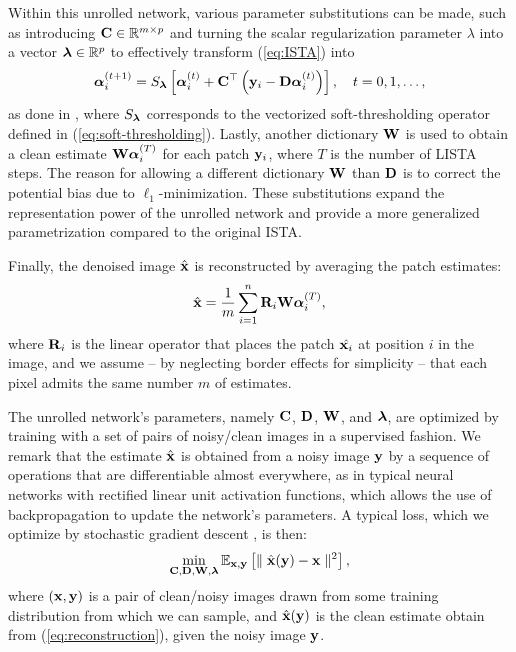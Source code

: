 Within this unrolled network, various parameter substitutions can be made, such as introducing $\mathbf C \in \mathbb R^{m \times p}$ and turning the scalar regularization parameter $\lambda$ into a vector $\boldsymbol \lambda \in \mathbb R^p$ to effectively transform (\ref{eq:ISTA}) into
\begin{equation}
\label{eq:ISTA_C}
    \boldsymbol \alpha_i^{(t+1)} = S_{\boldsymbol \lambda}\left[\boldsymbol \alpha_i^{(t)} + \mathbf C^{\top}\left(\mathbf y_i - \mathbf D \boldsymbol \alpha_i^{(t)} \right)\right], \quad t=0,1,\ldots,
\end{equation}
as done in \cite{simon_rethinking_2019, lecouat_fully_2020}, where $S_{\boldsymbol \lambda}$ corresponds to the vectorized soft-thresholding operator defined in (\ref{eq:soft-thresholding}).
Lastly, another dictionary $\mathbf W$ is used to obtain a clean estimate $\mathbf W \boldsymbol \alpha_i^{(T)}$ for each patch $\mathbf y_i$, where $T$ is the number of LISTA steps.
The reason for allowing a different dictionary $\mathbf W$ than $\mathbf D$ is to correct the potential bias due to $\ell_1$-minimization.
These substitutions expand the representation power of the unrolled network and provide a more generalized parametrization compared to the original ISTA.

Finally, the denoised image $\hat{\mathbf x}$ is reconstructed by averaging the patch estimates:
\begin{equation}
\label{eq:reconstruction}
    \hat{\mathbf x} = \frac{1}{m} \sum_{i=1}^n \mathbf R_i \mathbf W \boldsymbol \alpha_i^{(T)},
\end{equation}
where $\mathbf R_i$ is the linear operator that places the patch $\hat{\mathbf x_i}$ at position $i$ in the image, and we assume -- by neglecting border effects for simplicity -- that each pixel admits the same number $m$ of estimates.


The unrolled network's parameters, namely $\mathbf C$, $\mathbf D$, $\mathbf W$, and $\boldsymbol \lambda$, are optimized by training with a set of pairs of noisy/clean images in a supervised fashion.
We remark that the estimate $\hat{\mathbf x}$ is obtained from a noisy image $\mathbf y$ by a sequence of operations that are differentiable almost everywhere, as in typical neural networks with rectified linear unit activation functions, which allows the use of backpropagation to update the network's parameters.
A typical loss, which we optimize by stochastic gradient descent \cite{lecun_efficient_2002}, is then:
\begin{equation}
\label{eq:loss_LISTA}
    \min_{\mathbf C, \mathbf D, \mathbf W, \boldsymbol \lambda} \mathbb{E}_{\mathbf x, \mathbf y} \left[\parallel \hat{\mathbf x}(\mathbf y) - \mathbf x \parallel^2\right],
\end{equation}
where $(\mathbf x, \mathbf y)$ is a pair of clean/noisy images drawn from some training distribution from which we can sample, and $\hat{\mathbf x}(\mathbf y)$ is the clean estimate obtain from (\ref{eq:reconstruction}), given the noisy image $\mathbf y$.

